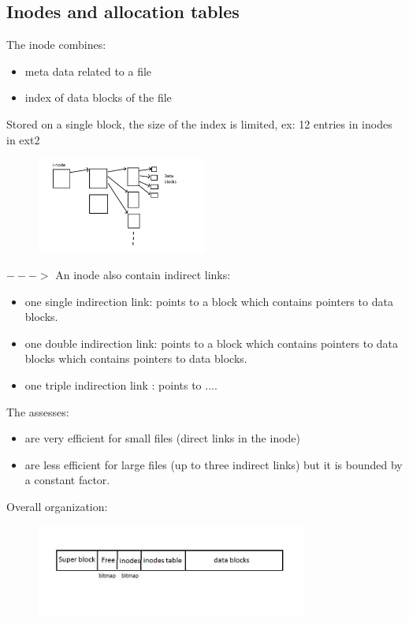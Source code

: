 \documentclass[a4paper,10pt]{report}
\newlength{\larg}
\begin{document}
\subsection{Inodes and allocation tables}

The inode combines:
\begin{itemize}
  \item meta data related to a file
  \item index of data blocks of the file
\end{itemize}

Stored on a single block, the size of the index is limited, ex: 12 entries in inodes in ext2

\begin{figure}[h!]
  \begin{center}
    \includegraphics[width=0.5\textwidth]{inode.jpg}
  \end{center}
\end{figure}

$--->$ An inode also contain indirect links:
\begin{itemize}
  \item one single indirection link: points to a block which contains pointers to data blocks.

  \item one double indirection link: points to a block which contains pointers to data blocks which contains pointers to data blocks.
  \item one triple indirection link : points to ....
  
\end{itemize}

The assesses:
\begin{itemize}
  \item are very efficient for small files (direct links in the inode)
  \item are less efficient for large files (up to three indirect links) but it is bounded by a constant factor.
\end{itemize}

Overall organization:

 \begin{figure}[h!]
  \begin{center}
    \includegraphics[width=0.8\textwidth]{inode_2.jpg}
  \end{center}
\end{figure}
\end{document}
